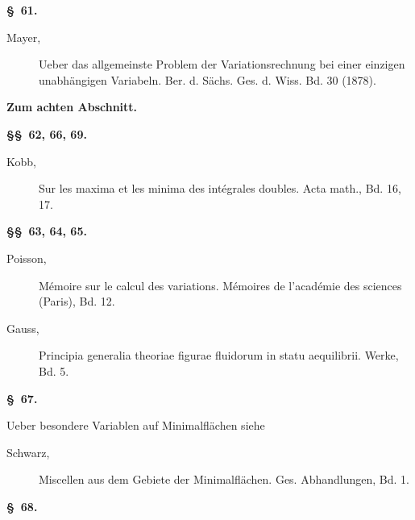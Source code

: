 \documentclass[11pt,a4paper,leqno]{article}
\begin{document}
\begin{center}{\bfseries \S~61.}\end{center}

\begin{description}
\item[Mayer,] Ueber das allgemeinste Problem der Variationsrechnung bei einer
einzigen unabhängigen Variabeln. Ber. d. Sächs. Ges. d. Wiss. Bd. 30 (1878).
\end{description}

\begin{center}
{\large\bfseries Zum achten Abschnitt.}

{\bfseries \S\S~62, 66, 69.}
\end{center}

\begin{description}
\item[Kobb,] Sur les maxima et les minima des intégrales doubles. Acta math.,
Bd. 16, 17.
\end{description}

\begin{center}{\bfseries \S\S~63, 64, 65.}\end{center}

\begin{description}
\item[Poisson,] Mémoire sur le calcul des variations. Mémoires de l'académie des
sciences (Paris), Bd. 12.

\item[Gauss,] Principia generalia theoriae figurae fluidorum in statu
aequilibrii. Werke, Bd. 5.
\end{description}

\begin{center}{\bfseries \S~67.}\end{center}

\noindent Ueber besondere Variablen auf Minimalflächen siehe

\begin{description}
\item[Schwarz,] Miscellen aus dem Gebiete der Minimalflächen. Ges.
Abhandlungen, Bd. 1.
\end{description}

\begin{center}{\bfseries \S~68.}\end{center}
\end{document}
